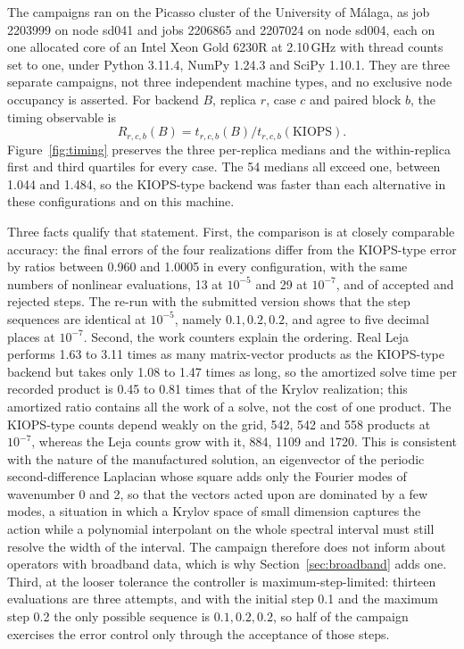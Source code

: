 The campaigns ran on the Picasso cluster of the University of M\'alaga, as
job 2203999 on node sd041 and jobs 2206865 and 2207024 on node sd004, each on
one allocated core of an Intel Xeon Gold 6230R at 2.10\,GHz with thread counts
set to one, under Python 3.11.4, NumPy 1.24.3 and SciPy 1.10.1.  They are three
separate campaigns, not three independent machine types, and no exclusive node
occupancy is asserted.  For backend $B$, replica $r$, case $c$ and paired
block $b$, the timing observable is
\begin{equation}
 R_{r,c,b}(B)=t_{r,c,b}(B)/t_{r,c,b}(\mathrm{KIOPS}).
\end{equation}
Figure~\ref{fig:timing} preserves the three per-replica medians and the
within-replica first and third quartiles for every case.  The 54 medians all
exceed one, between 1.044 and 1.484, so the KIOPS-type backend was faster than
each alternative in these configurations and on this machine.

Three facts qualify that statement.  First, the comparison is at closely
comparable accuracy: the final errors of the four realizations differ from the
KIOPS-type error by ratios between 0.960 and 1.0005 in every configuration,
with the same numbers of nonlinear evaluations, 13 at $10^{-5}$ and 29 at
$10^{-7}$, and of accepted and rejected steps.  The re-run with the submitted
version shows that the step sequences are identical at $10^{-5}$, namely
$0.1,0.2,0.2$, and agree to five decimal places at $10^{-7}$.  Second, the work
counters explain the ordering.  Real Leja performs 1.63 to 3.11 times as many
matrix-vector products as the KIOPS-type backend but takes only 1.08 to 1.47
times as long, so the amortized solve time per recorded product is 0.45 to
0.81 times that of the Krylov realization; this amortized ratio contains all
the work of a solve, not the cost of one product.  The KIOPS-type counts
depend weakly on the grid, 542, 542 and 558 products at $10^{-7}$, whereas the
Leja counts grow with it, 884, 1109 and 1720.  This is consistent with the
nature of the manufactured solution, an eigenvector of the periodic
second-difference Laplacian whose square adds only the Fourier modes of
wavenumber 0 and 2, so that the vectors acted upon are dominated by a few
modes, a situation in which a Krylov space of small dimension captures the
action while a polynomial interpolant on the whole spectral interval must
still resolve the width of the interval.  The campaign therefore does not
inform about operators with broadband data, which is why
Section~\ref{sec:broadband} adds one.  Third, at the looser tolerance the
controller is maximum-step-limited: thirteen evaluations are three attempts,
and with the initial step 0.1 and the maximum step 0.2 the only possible
sequence is $0.1,0.2,0.2$, so half of the campaign exercises the error control
only through the acceptance of those steps.

